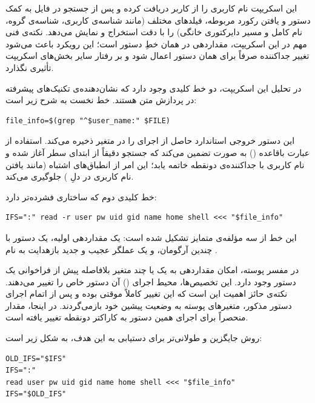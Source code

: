 این اسکریپت نام کاربری را از کاربر دریافت کرده و پس از جستجو در فایل  به کمک دستور  و یافتن رکورد مربوطه، فیلدهای مختلف (مانند شناسه‌ی کاربری، شناسه‌ی گروه، نام کامل و مسیر دایرکتوری خانگی) را با دقت استخراج و نمایش می‌دهد. نکته‌ی فنی مهم در این اسکریپت، مقداردهی  در همان خطِ دستور  است؛ این رویکرد باعث می‌شود تغییر جداکننده صرفاً برای همان دستور اعمال شود و بر رفتار سایر بخش‌های اسکریپت تأثیری نگذارد.

در تحلیل این اسکریپت، دو خط کلیدی وجود دارد که نشان‌دهنده‌ی تکنیک‌های پیشرفته در پردازش متن هستند. خط نخست به شرح زیر است:

\begin{latin}
\begin{lstlisting}
file_info=$(grep "^$user_name:" $FILE)
\end{lstlisting}
\end{latin}

این دستور خروجی استاندارد حاصل از اجرای  را در متغیر  ذخیره می‌کند. استفاده از عبارت باقاعده () به صورت  تضمین می‌کند که جستجو دقیقاً از ابتدای سطر آغاز شده و نام کاربری با جداکننده‌ی دو‌نقطه خاتمه یابد؛ این امر از انطباق‌های اشتباه (مانند یافتن نام کاربری  در دلِ ) جلوگیری می‌کند.

خط کلیدی دوم که ساختاری فشرده‌تر دارد:

\begin{latin}
\begin{lstlisting}
IFS=":" read -r user pw uid gid name home shell <<< "$file_info"
\end{lstlisting}
\end{latin}

این خط از سه مؤلفه‌ی متمایز تشکیل شده است: یک مقداردهی اولیه، یک دستور  با چندین آرگومان، و یک عملگر عجیب و جدید بازهدایت به نام .

در مفسر پوسته، امکان مقداردهی به یک یا چند متغیر بلافاصله پیش از فراخوانی یک دستور وجود دارد. این تخصیص‌ها، محیط اجرای () آن دستور خاص را تغییر می‌دهند. نکته‌ی حائز اهمیت این است که این تغییر کاملاً موقتی بوده و پس از اتمام اجرای دستور مذکور، متغیرهای پوسته به وضعیت پیشین خود بازمی‌گردند. در اینجا، مقدار  منحصراً برای اجرای همین دستور  به کاراکتر دو‌نقطه تغییر یافته است.

روش جایگزین و طولانی‌تر برای دستیابی به این هدف، به شکل زیر است:

\begin{latin}
\begin{lstlisting}
OLD_IFS="$IFS"
IFS=":"
read user pw uid gid name home shell <<< "$file_info"
IFS="$OLD_IFS"
\end{lstlisting}
\end{latin}

